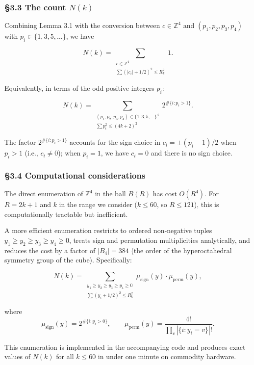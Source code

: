 \documentclass[a4paper,11pt]{article}
\theoremstyle{definition}
\begin{document}
\subsubsection{\texorpdfstring{§3.3 The count
\(N(k)\)}{§3.3 The count N(k)}}\label{the-count-nk}

Combining Lemma 3.1 with the conversion between \(c \in \mathbb{Z}^4\)
and \((p_1, p_2, p_3, p_4)\) with \(p_i \in \{1, 3, 5, \ldots\}\), we
have

\[N(k) = \sum_{\substack{c \in \mathbb{Z}^4 \\ \sum (|c_i| + 1/2)^2 \le R_k^2}} 1.\]

Equivalently, in terms of the odd positive integers \(p_i\):

\[N(k) = \sum_{\substack{(p_1, p_2, p_3, p_4) \in \{1,3,5,\ldots\}^4 \\ \sum p_i^2 \le (4k+2)^2}} 2^{\#\{i : p_i > 1\}}.\]

The factor \(2^{\#\{i : p_i > 1\}}\) accounts for the sign choice in
\(c_i = \pm (p_i - 1)/2\) when \(p_i > 1\) (i.e., \(c_i \neq 0\)); when
\(p_i = 1\), we have \(c_i = 0\) and there is no sign choice.

\subsubsection{§3.4 Computational
considerations}\label{computational-considerations}

The direct enumeration of \(\mathbb{Z}^4\) in the ball \(B(R)\) has cost
\(O(R^4)\). For \(R = 2k+1\) and \(k\) in the range we consider
(\(k \le 60\), so \(R \le 121\)), this is computationally tractable but
inefficient.

A more efficient enumeration restricts to ordered non-negative tuples
\(y_1 \ge y_2 \ge y_3 \ge y_4 \ge 0\), treats sign and permutation
multiplicities analytically, and reduces the cost by a factor of
\(|B_4| = 384\) (the order of the hyperoctahedral symmetry group of the
cube). Specifically:

\[N(k) = \sum_{\substack{y_1 \ge y_2 \ge y_3 \ge y_4 \ge 0 \\ \sum (y_i + 1/2)^2 \le R_k^2}} \mu_{\mathrm{sign}}(y) \cdot \mu_{\mathrm{perm}}(y),\]

where
\[\mu_{\mathrm{sign}}(y) = 2^{\#\{i : y_i > 0\}}, \qquad \mu_{\mathrm{perm}}(y) = \frac{4!}{\prod_v |\{i : y_i = v\}|!}.\]

This enumeration is implemented in the accompanying code and produces
exact values of \(N(k)\) for all \(k \le 60\) in under one minute on
commodity hardware.
\end{document}
